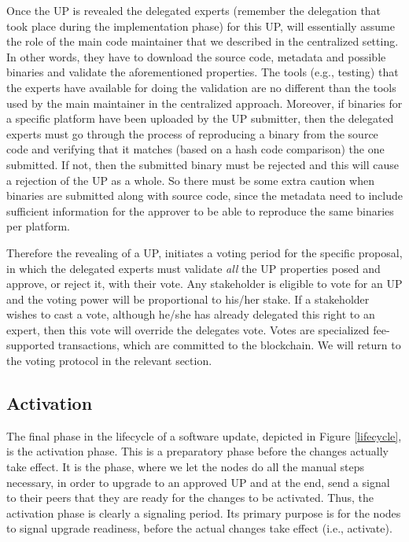 Once the UP is revealed the delegated experts (remember the delegation that took place during the implementation phase) for this UP, will essentially assume the role of the main code maintainer that we described in the centralized setting. In other words, they have to download the source code, metadata and possible binaries and validate the aforementioned properties. The tools (e.g., testing) that the experts have available for doing the validation are no different than the tools used by the main maintainer in the centralized approach. Moreover, if binaries for a specific platform have been uploaded by the UP submitter, then the delegated experts must go through the process of reproducing a binary from the source code and verifying that it matches (based on a hash code comparison) the one submitted. If not, then the submitted binary must be rejected and this will cause a rejection of the UP as a whole. So there must be some extra caution when binaries are submitted along with source code, since the metadata need to include sufficient information for the approver to be able to reproduce the same binaries per platform.

Therefore the revealing of a UP, initiates a voting period for the specific proposal, in which the delegated experts must validate \emph{all} the UP properties posed and approve, or reject it, with their vote. Any stakeholder is eligible to vote for an UP and the voting power will be proportional to his/her stake. If a stakeholder wishes to cast a vote, although he/she has already delegated this right to an expert, then this vote will override the delegates vote. Votes are specialized fee-supported transactions, which are committed to the blockchain. We will return to the voting protocol in the relevant section.

\subsection{Activation}

The final phase in the lifecycle of a software update, depicted in Figure \ref{lifecycle}, is the activation phase. This is a preparatory phase before the changes actually take effect. It is the phase, where we let the nodes do all the manual steps necessary, in order to upgrade to an approved UP and at the end, send a signal to their peers that they are ready for the changes to be activated. Thus, the activation phase is clearly a signaling period. Its primary purpose is for the nodes to signal upgrade readiness, before the actual changes take effect (i.e., activate). 

